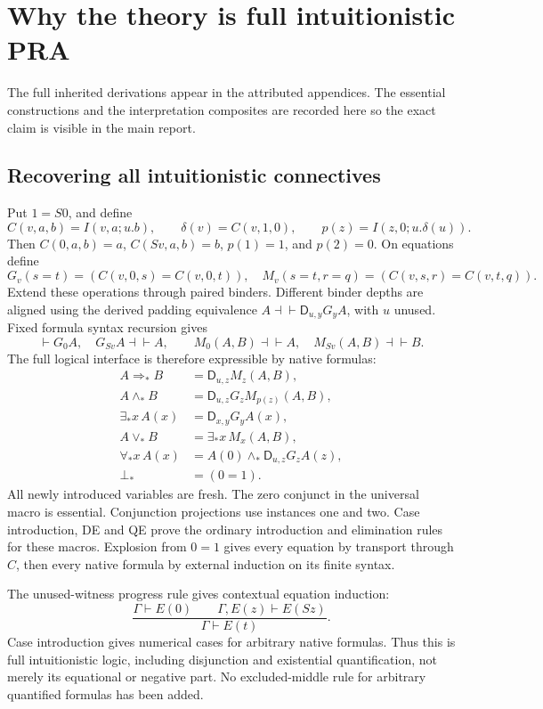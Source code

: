 \documentclass[11pt,letterpaper]{article}
\theoremstyle{definition}\newtheorem{definition}[theorem]{Definition}
\theoremstyle{remark}\newtheorem{remark}[theorem]{Remark}
\newcommand{\D}{\mathsf D}
\begin{document}
\section{Why the theory is full intuitionistic PRA}
\label{sec:bridge-summary}

The full inherited derivations appear in the attributed appendices.
The essential constructions and the interpretation composites are
recorded here so the exact claim is visible in the main report.

\subsection{Recovering all intuitionistic connectives}

Put \(1=S0\), and define
\[
 C(v,a,b)=I(v,a;u.b),\qquad
 \delta(v)=C(v,1,0),\qquad
 p(z)=I(z,0;u.\delta(u)).
\]
Then \(C(0,a,b)=a\), \(C(Sv,a,b)=b\), \(p(1)=1\), and
\(p(2)=0\). On equations define
\[
 G_v(s=t)=(C(v,0,s)=C(v,0,t)),
 \quad
 M_v(s=t,r=q)=(C(v,s,r)=C(v,t,q)).
\]
Extend these operations through paired binders. Different binder depths
are aligned using the derived padding equivalence
\(A\dashv\vdash\D_{u,y}G_yA\), with \(u\) unused. Fixed formula
syntax recursion gives
\[
 \vdash G_0A,\quad G_{Sv}A\dashv\vdash A,\qquad
 M_0(A,B)\dashv\vdash A,\quad M_{Sv}(A,B)\dashv\vdash B.
\]
The full logical interface is therefore expressible by native formulas:
\begin{align*}
 A\Rightarrow_*B&=\D_{u,z}M_z(A,B),\\
 A\wedge_*B&=\D_{u,z}G_zM_{p(z)}(A,B),\\
 \exists_*x\,A(x)&=\D_{x,y}G_yA(x),\\
 A\vee_*B&=\exists_*x\,M_x(A,B),\\
 \forall_*x\,A(x)&=A(0)\wedge_*\D_{u,z}G_zA(z),\\
 \bot_*&=(0=1).
\end{align*}
All newly introduced variables are fresh. The zero conjunct in the
universal macro is essential. Conjunction projections use instances
one and two. Case introduction, DE and QE prove the ordinary
introduction and elimination rules for these macros. Explosion from
\(0=1\) gives every equation by transport through \(C\), then every
native formula by external induction on its finite syntax.

The unused-witness progress rule gives contextual equation induction:
\[
 \frac{\Gamma\vdash E(0)\qquad\Gamma,E(z)\vdash E(Sz)}
      {\Gamma\vdash E(t)}.
\]
Case introduction gives numerical cases for arbitrary native formulas.
Thus this is full intuitionistic logic, including disjunction and
existential quantification, not merely its equational or negative part.
No excluded-middle rule for arbitrary quantified formulas has been added.
\end{document}

